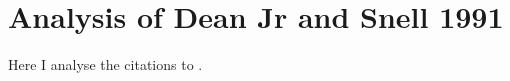 \section{Analysis of Dean Jr and Snell 1991}

Here I analyse the citations to \cite{dean1991integrated}.\\

